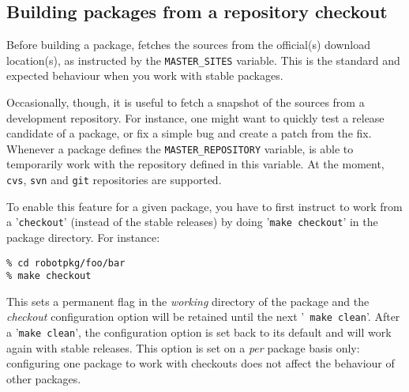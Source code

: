 

\subsection{Building packages from a repository checkout} %

Before building a  package, \robotpkg fetches the sources  from the official(s)
download  location(s),  as  instructed  by the  {\tt  MASTER\_SITES}  variable.
This is the standard and expected behaviour when you work with stable packages.

Occasionally, though,  it is useful to fetch  a snapshot of the  sources from a
development repository. For instance, one  might want to quickly test a release
candidate of a  package, or fix a simple  bug and create a patch  from the fix.
Whenever a package defines  the {\tt MASTER\_REPOSITORY} variable, \robotpkg is
able to temporarily  work with the repository defined in  this variable. At the
moment, {\tt cvs}, {\tt svn} and {\tt git} repositories are supported.

To enable this feature for a given package,  you have to first instruct
\robotpkg to work from a '{\tt checkout}' (instead of the stable releases) by
doing '{\tt make checkout}' in the package directory. For instance:

\begin{verbatim}
% cd robotpkg/foo/bar
% make checkout
\end{verbatim}

This sets  a permanent flag in the  {\em working} directory of  the package and
the {\em checkout}  configuration option will be retained  until the next '{\tt
make clean}'. After a '{\tt make  clean}', the configuration option is set back
to its default and \robotpkg will  work again with stable releases. This option
is set on a {\em per} package  basis only: configuring one package to work with
checkouts does not affect the behaviour of other packages.

